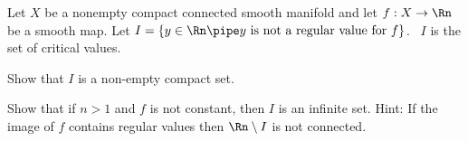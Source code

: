 Let $X$ be a nonempty compact connected smooth manifold and let
$f:X\rightarrow \Rn$ be a smooth map. Let $I=\{y\in \Rn \pipe y
\text{\ is not a regular value for\ } f\}$. \Ie\ $I$ is the set of
critical values.
\begin{alist}
\item Show that $I$ is a non-empty compact set.
\item Show that if $n>1$ and $f$ is not constant, then $I$ is an
infinite set. Hint: If the image of $f$ contains regular values then
$\Rn\setminus I$ is not connected.
\end{alist}
